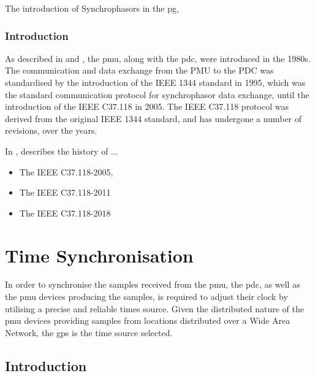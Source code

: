 The introduction of Synchrophasors in the \acrlong{pg}, 

\subsubsection{Introduction}



As described in \cite{martin2011synchrophasor} and \cite{ali2016performance}, the \acrfull{pmu}, along with the \acrfull{pdc}, were introduced in the 1980s. The communication and data exchange from the PMU to the PDC was standardised by the introduction of the IEEE 1344 standard in 1995, which was the standard communication protocol for synchrophasor data exchange, until the introduction of the IEEE C37.118 in 2005.
The  IEEE C37.118 protocol was derived from the original IEEE 1344 standard, and has undergone a number of revisions, over the years.


In \cite{martin2013synchrophasor}, \citeauthor{martin2013synchrophasor}describes the history of ...

\begin{itemize}
    \item The IEEE C37.118-2005,
    \item The IEEE C37.118-2011
    \item The IEEE C37.118-2018
\end{itemize}







\section{Time Synchronisation}
In order to synchronise the samples received from the \acrshort{pmu}, the \acrshort{pdc}, as well as the \acrshort{pmu} devices producing the samples, is required to adjust their clock by utilising a precise and reliable times source.  Given the distributed nature of the \acrshort{pmu} devices providing samples from locations distributed over a Wide Area Network, the \acrfull{gps} is the  time source selected. 

\subsection{Introduction}


